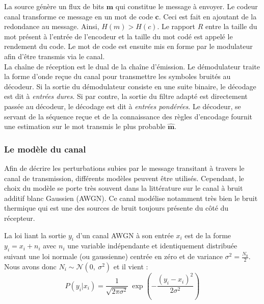 La source génère un flux de bits $\mathbf{m}$ qui constitue le message à envoyer. Le codeur canal transforme ce message 
en un mot de code $\mathbf{c}$. Ceci est fait en ajoutant de la redondance au message. Ainsi, $H(m)>H(c)$. Le rapport $R$
entre la taille du mot présent à l'entrée de l'encodeur et la taille du mot codé est appelé le rendement du code. Le mot de code est ensuite mis en forme par le modulateur afin d'être transmis via le canal.\\
La chaîne de réception est le dual de la chaîne d’émission. Le démodulateur traite la forme d'onde reçue du canal 
pour transmettre les symboles bruités au décodeur. Si la sortie du démodulateur consiste en une suite binaire, le 
décodage est dit à \emph{entrées dures}. Si par contre, la sortie du filtre adapté est directement passée au décodeur, 
le décodage est dit à \emph{entrées pondérées}. Le décodeur, se servant de la séquence reçue et de la connaissance des règles 
d'encodage fournit une estimation sur le  mot transmis le plus probable $\mathbf{\hat{m}}$.


\subsubsection{Le modèle du canal}\label{ss:cod_canal}
Afin de décrire les perturbations subies par le message transitant à travers le canal de transmission, différents modèles 
peuvent être utilisés. 
Cependant, le choix du modèle se porte très souvent dans la littérature sur le canal à bruit additif blanc Gaussien 
(AWGN). 
Ce canal modélise notamment très bien le bruit thermique qui est une des sources de bruit toujours présente du côté du récepteur.

La loi liant la sortie $y_i$ d'un canal AWGN à son entrée $x_i$ est de la forme $y_i=x_i+n_i$ avec $n_i$ une variable 
indépendante et identiquement distribuée suivant une loi normale (ou gaussienne) centrée en zéro et de variance $\sigma^2 = \frac{N_0}{2}$. Nous avons donc
$N_i \sim \mathcal{N}(0,\ \sigma^2)$ et il vient :
\begin{equation}
	\label{eq:p(y|x)}
	P(y_i|x_i) = \frac{1}{\sqrt{2\pi \sigma^2}}~\exp\left(-{\frac{(y_i-x_i)^2}{2\sigma^2}}\right)
\end{equation}

